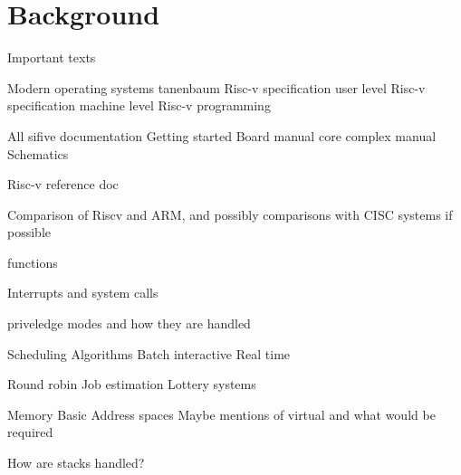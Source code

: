 \chapter[Background]{Background}

Important texts

Modern operating systems tanenbaum
Risc-v specification user level
Risc-v specification machine level
Risc-v programming

All sifive documentation
    Getting started
    Board manual
    core complex manual
    Schematics

Risc-v reference doc

Comparison of Riscv and ARM, and possibly comparisons with CISC systems if possible

functions

Interrupts and system calls

priveledge modes and how they are handled


Scheduling Algorithms
    Batch
    interactive
    Real time

    Round robin
    Job estimation
    Lottery systems

Memory
    Basic
    Address spaces
    Maybe mentions of virtual and what would be required

    How are stacks handled?
    